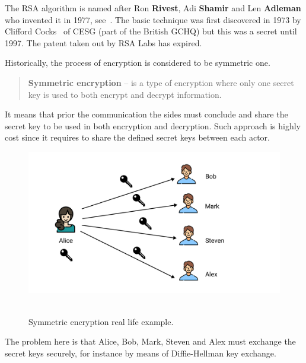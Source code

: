 ﻿The RSA algorithm is named after Ron \textbf{Rivest}, Adi \textbf{Shamir} and Len \textbf{Adleman}
who invented it in 1977, see~\cite{rivest1978method}.
The basic technique was first discovered in 1973 by Clifford Cocks~\cite{cocks1973note} of
CESG (part of the British GCHQ)
but this was a secret until 1997.
The patent taken out by RSA Labs has expired.

Historically, the process of encryption is considered to be symmetric one.
\begin{quote}
    \textbf{Symmetric encryption} -- is a type of encryption where only one secret key is
    used to both encrypt and decrypt information.
\end{quote}
It means that prior the communication the sides must conclude and share the secret key to be used in
both encryption and decryption.
Such approach is highly cost since it requires to share the defined secret keys between each actor.

\begin{figure}[H]
    \centering
    \includegraphics[width=1.15\textwidth]{img/Symmetric_encryption}
    ~\caption{Symmetric encryption real life example.}
    \label{fig:symmetric-encryption}
\end{figure}

The problem here is that Alice, Bob, Mark, Steven and Alex must exchange the secret keys securely,
for instance by means of Diffie-Hellman key exchange.

